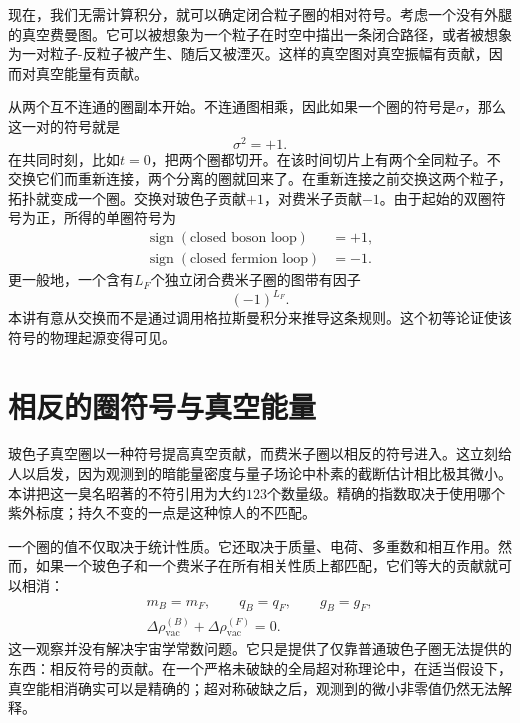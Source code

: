 现在，我们无需计算积分，就可以确定闭合粒子圈的相对符号。考虑一个没有外腿的真空费曼图。它可以被想象为一个粒子在时空中描出一条闭合路径，或者被想象为一对粒子-反粒子被产生、随后又被湮灭。这样的真空图对真空振幅有贡献，因而对真空能量有贡献。

从两个互不连通的圈副本开始。不连通图相乘，因此如果一个圈的符号是\(\sigma\)，那么这一对的符号就是
\begin{equation}
\sigma^2=+1.
\end{equation}
在共同时刻，比如\(t=0\)，把两个圈都切开。在该时间切片上有两个全同粒子。不交换它们而重新连接，两个分离的圈就回来了。在重新连接之前交换这两个粒子，拓扑就变成一个圈。交换对玻色子贡献\(+1\)，对费米子贡献\(-1\)。由于起始的双圈符号为正，所得的单圈符号为
\begin{equation}
\begin{aligned}
\operatorname{sign}(\text{closed boson loop})&=+1,\\
\operatorname{sign}(\text{closed fermion loop})&=-1.
\end{aligned}
\end{equation}
更一般地，一个含有\(L_F\)个独立闭合费米子圈的图带有因子
\begin{equation}
(-1)^{L_F}.
\end{equation}
本讲有意从交换而不是通过调用格拉斯曼积分来推导这条规则。这个初等论证使该符号的物理起源变得可见。

\section{相反的圈符号与真空能量}

玻色子真空圈以一种符号提高真空贡献，而费米子圈以相反的符号进入。这立刻给人以启发，因为观测到的暗能量密度与量子场论中朴素的截断估计相比极其微小。本讲把这一臭名昭著的不符引用为大约\(123\)个数量级。精确的指数取决于使用哪个紫外标度；持久不变的一点是这种惊人的不匹配。

一个圈的值不仅取决于统计性质。它还取决于质量、电荷、多重数和相互作用。然而，如果一个玻色子和一个费米子在所有相关性质上都匹配，它们等大的贡献就可以相消：
\begin{equation}
\begin{gathered}
m_B=m_F,\qquad q_B=q_F,\qquad g_B=g_F,\\
\Delta\rho_{\mathrm{vac}}^{(B)}
+\Delta\rho_{\mathrm{vac}}^{(F)}=0.
\end{gathered}
\end{equation}
这一观察并没有解决宇宙学常数问题。它只是提供了仅靠普通玻色子圈无法提供的东西：相反符号的贡献。在一个严格未破缺的全局超对称理论中，在适当假设下，真空能相消确实可以是精确的；超对称破缺之后，观测到的微小非零值仍然无法解释。

